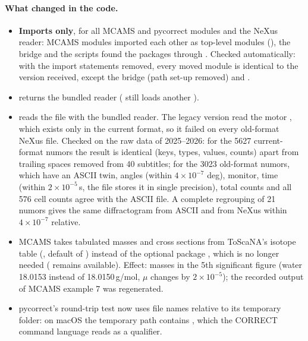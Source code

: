 \documentclass[11pt,a4paper]{article}
\begin{document}
\paragraph{What changed in the code.}
\begin{itemize}
  \item \textbf{Imports only}, for all MCAMS and pycorrect modules and the
    NeXus reader: MCAMS modules imported each other as top-level modules
    (), the bridge and the scripts found the packages
    through . Checked automatically: with the import
    statements removed, every moved module is identical to the version
    received, except the bridge (path set-up removed) and
    .
  \item {} returns the bundled reader
    ( still loads another ).
  \item {} \newbeh{} reads the file with the
    bundled reader. The legacy version read the motor
    , which exists only in the current format, so it
    failed on every old-format NeXus file. Checked on the raw data of
    2025--2026: for the 5627 current-format numors the result is identical
    (keys, types, values, counts) apart from trailing spaces removed from
    40 subtitles; for the 3023 old-format numors, which have an ASCII twin,
    angles (within $4\times10^{-7}$ deg), monitor, time (within
    $2\times10^{-5}$\,s, the file stores it in single precision), total
    counts and all 576 cell counts agree with the ASCII file. A complete
     regrouping of 21 numors gives the same diffractogram from
    ASCII and from NeXus within $4\times10^{-7}$ relative.
  \item MCAMS takes tabulated masses and cross sections from ToScaNA's
    isotope table (, default of
    ) instead of the optional package
    , which is no longer needed (
    remains available). Effect: masses in the 5th significant figure (water
    18.0153 instead of 18.0150\,g/mol, $\mu$ changes by $2\times10^{-5}$);
    the recorded output of MCAMS example 7 was regenerated.
  \item pycorrect's round-trip test now uses file names relative to its
    temporary folder: on macOS the temporary path contains , which
    the CORRECT command language reads as a qualifier.
\end{itemize}
\end{document}
